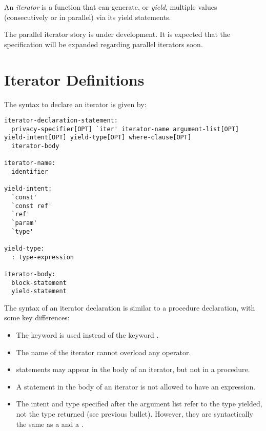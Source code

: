 \label{Iterators}

An \emph{iterator} is a function that can generate, or \emph{yield}, multiple values (consecutively or in parallel) via its yield statements.

\begin{openissue}
The parallel iterator story is under development.  It is expected that
the specification will be expanded regarding parallel iterators soon.
\end{openissue}

\section{Iterator Definitions}
\label{Iterator_Function_Definitions}

The syntax to declare an iterator is given
by:
\begin{syntax}
\begin{verbatim}
iterator-declaration-statement:
  privacy-specifier[OPT] `iter' iterator-name argument-list[OPT] yield-intent[OPT] yield-type[OPT] where-clause[OPT]
  iterator-body

iterator-name:
  identifier

yield-intent:
  `const'
  `const ref'
  `ref'
  `param'
  `type'

yield-type:
  : type-expression

iterator-body:
  block-statement
  yield-statement
\end{verbatim}
\end{syntax}

The syntax of an iterator declaration is similar to a procedure declaration, with
some key differences:
\begin{itemize}
\item The keyword  is used instead of the keyword .
\item The name of the iterator cannot overload any operator.
\item {} statements may appear in the body of an iterator, but not in
a procedure.
\item A  statement in the body of an iterator is not allowed to have an expression.
\item The intent and type specified after the argument list refer to the type
yielded, not the type returned (see previous bullet).  However, they are
syntactically the same as a  and a .
\end{itemize}

